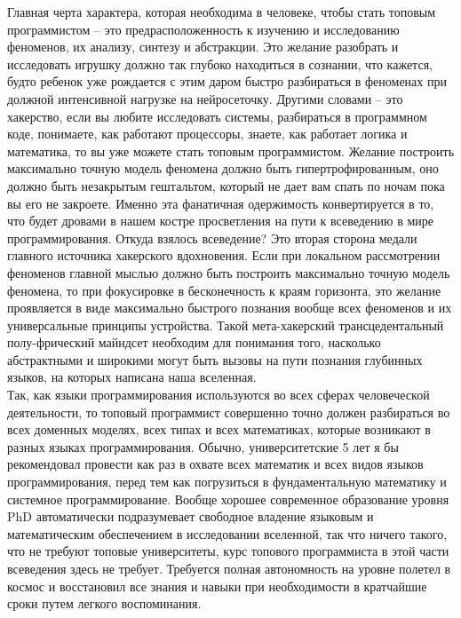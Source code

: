 Главная черта характера, которая необходима в человеке, чтобы стать топовым программистом – это предрасположенность к изучению и исследованию феноменов, их анализу, синтезу и абстракции. Это желание разобрать и исследовать игрушку должно так глубоко находиться в сознании, что кажется, будто ребенок уже рождается с этим даром быстро разбираться в феноменах при должной интенсивной нагрузке на нейросеточку. Другими словами – это хакерство, если вы любите исследовать системы, разбираться в программном коде, понимаете, как работают процессоры, знаете, как работает логика и математика, то вы уже можете стать топовым программистом. Желание построить максимально точную модель феномена должно быть гипертрофированным, оно должно быть незакрытым гештальтом, который не дает вам спать по ночам пока вы его не закроете. Именно эта фанатичная одержимость конвертируется в то, что будет дровами в нашем костре просветления на пути к всеведению в мире программирования. Откуда взялось всеведение? Это вторая сторона медали главного источника хакерского вдохновения. Если при локальном рассмотрении феноменов главной мыслью должно быть построить максимально точную модель феномена, то при фокусировке в бесконечность к краям горизонта, это желание проявляется в виде максимально быстрого познания вообще всех феноменов и их универсальные принципы устройства. Такой мета-хакерский трансцедентальный полу-фрический майндсет необходим для понимания того, насколько абстрактными и широкими могут быть вызовы на пути познания глубинных языков, на которых написана наша вселенная.
\\
Так, как языки программирования используются во всех сферах человеческой деятельности, то топовый программист совершенно точно должен разбираться во всех доменных моделях, всех типах и всех математиках, которые возникают в разных языках программирования. Обычно, университетские 5 лет я бы рекомендовал провести как раз в охвате всех математик и всех видов языков программирования, перед тем как погрузиться в фундаментальную математику и системное программирование. Вообще хорошее современное образование уровня PhD автоматически подразумевает свободное владение языковым и математическим обеспечением в исследовании вселенной, так что ничего такого, что не требуют топовые университеты, курс топового программиста в этой части всеведения здесь не требует. Требуется полная автономность на уровне полетел в космос и восстановил все знания и навыки при необходимости в кратчайшие сроки путем легкого воспоминания.
\\
